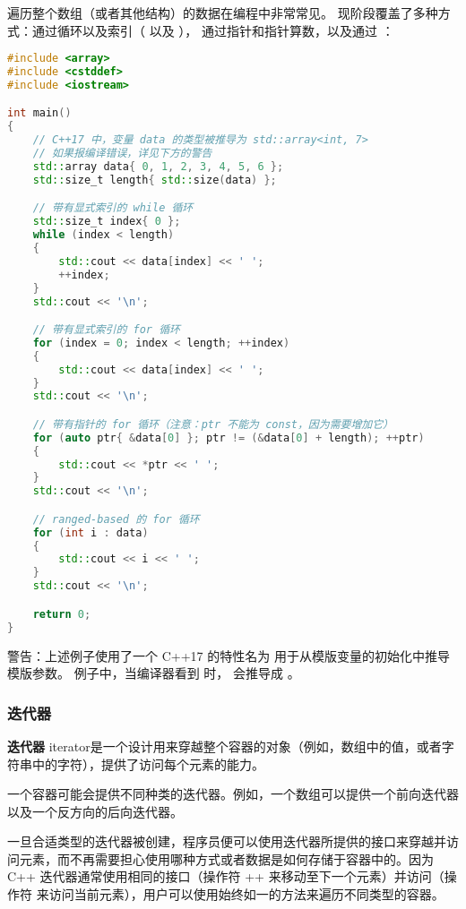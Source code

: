 \documentclass[../../LearnCpp.tex]{subfiles}
\begin{document}

遍历整个数组（或者其他结构）的数据在编程中非常常见。
现阶段覆盖了多种方式：通过循环以及索引（ 以及 ），
通过指针和指针算数，以及通过 ：

\begin{lstlisting}[language=C++]
#include <array>
#include <cstddef>
#include <iostream>

int main()
{
    // C++17 中，变量 data 的类型被推导为 std::array<int, 7>
    // 如果报编译错误，详见下方的警告
    std::array data{ 0, 1, 2, 3, 4, 5, 6 };
    std::size_t length{ std::size(data) };

    // 带有显式索引的 while 循环
    std::size_t index{ 0 };
    while (index < length)
    {
        std::cout << data[index] << ' ';
        ++index;
    }
    std::cout << '\n';

    // 带有显式索引的 for 循环
    for (index = 0; index < length; ++index)
    {
        std::cout << data[index] << ' ';
    }
    std::cout << '\n';

    // 带有指针的 for 循环（注意：ptr 不能为 const，因为需要增加它）
    for (auto ptr{ &data[0] }; ptr != (&data[0] + length); ++ptr)
    {
        std::cout << *ptr << ' ';
    }
    std::cout << '\n';

    // ranged-based 的 for 循环
    for (int i : data)
    {
        std::cout << i << ' ';
    }
    std::cout << '\n';

    return 0;
}
\end{lstlisting}

警告：上述例子使用了一个 C++17 的特性名为  用于从模版变量的初始化中推导模版参数。
例子中，当编译器看到  时，
会推导成 。

\subsubsection*{迭代器}

\textbf{迭代器} iterator是一个设计用来穿越整个容器的对象（例如，数组中的值，或者字符串中的字符），提供了访问每个元素的能力。

一个容器可能会提供不同种类的迭代器。例如，一个数组可以提供一个前向迭代器以及一个反方向的后向迭代器。

一旦合适类型的迭代器被创建，程序员便可以使用迭代器所提供的接口来穿越并访问元素，而不再需要担心使用哪种方式或者数据是如何存储于容器中的。因为 C++ 迭代器通常使用相同的接口（操作符 ++ 来移动至下一个元素）并访问（操作符 \* 来访问当前元素），用户可以使用始终如一的方法来遍历不同类型的容器。
\end{document}
